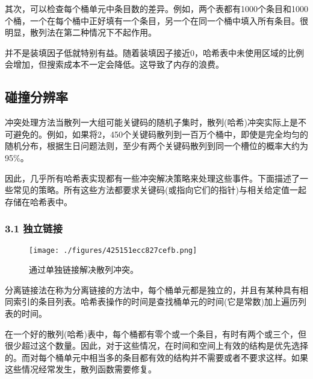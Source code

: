 其次，可以检查每个桶单元中条目数的差异。例如，两个表都有1000个条目和1000个桶，一个在每个桶中正好填有一个条目，另一个在同一个桶中填入所有条目。很明显，散列法在第二种情况下不起作用。

并不是装填因子低就特别有益。随着装填因子接近0，哈希表中未使用区域的比例会增加，但搜索成本不一定会降低。这导致了内存的浪费。

\subsection{碰撞分辨率}
冲突处理方法当散列一大组可能关键码的随机子集时，散列(哈希)冲突实际上是不可避免的。例如，如果将2，450个关键码散列到一百万个桶中，即使是完全均匀的随机分布，根据生日问题法则，至少有两个关键码散列到同一个槽位的概率大约为95\%。

因此，几乎所有哈希表实现都有一些冲突解决策略来处理这些事件。下面描述了一些常见的策略。所有这些方法都要求关键码(或指向它们的指针)与相关给定值一起存储在哈希表中。

\subsubsection{3.1 独立链接}
\begin{figure}[ht]
\centering
\texttt{[image: ./figures/425151ecc827cefb.png]}
\caption{通过单独链接解决散列冲突。} \label{fig_HXB_1}
\end{figure}
分离链接法在称为分离链接的方法中，每个桶单元都是独立的，并且有某种具有相同索引的条目列表。哈希表操作的时间是查找桶单元的时间(它是常数)加上遍历列表的时间。

在一个好的散列(哈希)表中，每个桶都有零个或一个条目，有时有两个或三个，但很少超过这个数量。因此，对于这些情况，在时间和空间上有效的结构是优先选择的。而对每个桶单元中相当多的条目都有效的结构并不需要或者不要求这样。如果这些情况经常发生，散列函数需要修复。